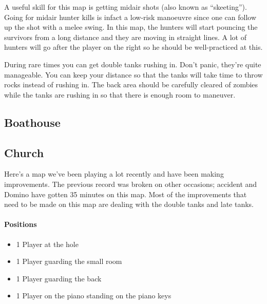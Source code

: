 A useful skill for this map is getting midair shots (also known as ``skeeting''). Going for midair hunter kills is infact a low-risk manoeuvre since one can follow up the shot with a melee swing. In this map, the hunters will start pouncing the survivors from a long distance and they are moving in straight lines. A lot of hunters will go after the player on the right so he should be well-practiced at this.

During rare times you can get double tanks rushing in. Don't panic, they're quite manageable. You can keep your distance so that the tanks will take time to throw rocks instead of rushing in. The back area should be carefully cleared of zombies while the tanks are rushing in so that there is enough room to maneuver.

\subsection{Boathouse}

\subsection{Church}
Here's a map we've been playing a lot recently and have been making improvements. The previous record was broken on other occasions; accident and Domino have gotten 35 minutes on this map. Most of the improvements that need to be made on this map are dealing with the double tanks and late tanks.

\paragraph{Positions}
\begin{itemize}
\item 1 Player at the hole
\item 1 Player guarding the small room
\item 1 Player guarding the back
\item 1 Player on the piano standing on the piano keys
\end{itemize}

